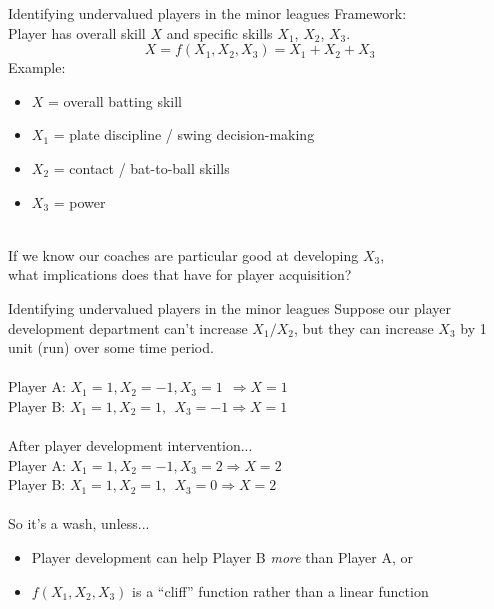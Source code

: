 \documentclass{beamer}
\begin{document}
\begin{frame}{Identifying undervalued players in the minor leagues}
  Framework:\\
  Player has overall skill $X$ and specific skills $X_1$, $X_2$, $X_3$.\\
  $$X = f(X_1, X_2, X_3) = X_1 + X_2 + X_3$$
  Example:
  \begin{itemize}
    \item $X$ = overall batting skill
    \item $X_1$ = plate discipline / swing decision-making
    \item $X_2$ = contact / bat-to-ball skills
    \item $X_3$ = power
  \end{itemize}
  ~\\
  If we know our coaches are particular good at developing $X_3$,\\
  what implications does that have for player acquisition?
\end{frame}

\begin{frame}{Identifying undervalued players in the minor leagues}
  Suppose our player development department can't increase $X_1/X_2$, but they can increase $X_3$ by 1 unit (run) over some time period.\\
  ~\\
  Player A: $X_1 = 1, X_2 = -1, X_3 = 1 ~~\Rightarrow X = 1$\\
  Player B: $X_1 = 1, X_2 = 1, ~~X_3 = -1 \Rightarrow X = 1$\\
  ~\\
  After player development intervention...\\
  Player A: $X_1 = 1, X_2 = -1, X_3 = 2 \Rightarrow X = 2$\\
  Player B: $X_1 = 1, X_2 = 1, ~~X_3 = 0 \Rightarrow X = 2$\\
  ~\\
  So it's a wash, unless...
  \begin{itemize}
    \item Player development can help Player B {\it more} than Player A, or
    \item $f(X_1, X_2, X_3)$ is a ``cliff'' function rather than a linear function
  \end{itemize}
\end{frame}
\end{document}

